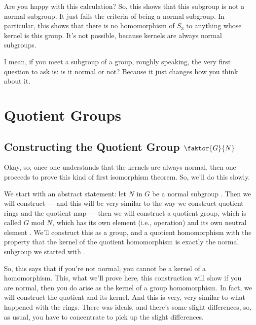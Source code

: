 \begin{speech}[00:52:43 - 00:53:13]
Are you happy with this calculation? So, this shows that this subgroup is not a normal subgroup. It just fails the criteria of being a normal subgroup. In particular, this shows that there is no homomorphism of $S_3$ to anything whose kernel is this group. It's not possible, because kernels are always normal subgroups.

I mean, if you meet a subgroup of a group, roughly speaking, the very first question to ask is: is it normal or not? Because it just changes how you think about it.
\end{speech}

\section{Quotient Groups}

\subsection{Constructing the Quotient Group \texorpdfstring{$\faktor{G}{N}$}{G/N}}

\begin{speech}[00:53:13 - 00:55:02]
Okay, so, once one understands that the kernels are always normal, then one proceeds to prove this kind of first isomorphism theorem. So, we'll do this slowly.

We start with an abstract statement: let $N$ in $G$ be a normal subgroup . Then we will construct --- and this will be very similar to the way we construct quotient rings and the quotient map --- then we will construct a quotient group, which is called $G$ mod $N$, which has its own element (i.e., operation) and its own neutral element . We'll construct this as a group, and a quotient homomorphism with the property that the kernel of the quotient homomorphism is exactly the normal subgroup we started with .

So, this says that if you're not normal, you cannot be a kernel of a homomorphism. This, what we'll prove here, this construction will show if you are normal, then you do arise as the kernel of a group homomorphism. In fact, we will construct the quotient and its kernel. And this is very, very similar to what happened with the rings. There was ideals, and there's some slight differences, so, as usual, you have to concentrate to pick up the slight differences.
\end{speech}

